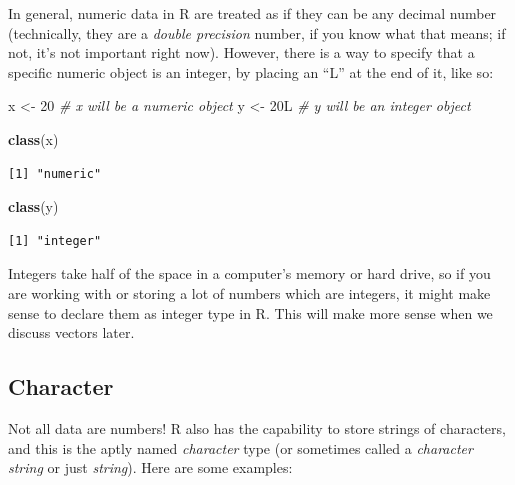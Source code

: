 \documentclass[
]{book}
\newenvironment{Shaded}{\begin{snugshade}}{\end{snugshade}}
\newcommand{\CommentTok}[1]{\textcolor[rgb]{0.56,0.35,0.01}{\textit{#1}}}
\newcommand{\DecValTok}[1]{\textcolor[rgb]{0.00,0.00,0.81}{#1}}
\newcommand{\KeywordTok}[1]{\textcolor[rgb]{0.13,0.29,0.53}{\textbf{#1}}}
\newcommand{\NormalTok}[1]{#1}
\newcommand{\StringTok}[1]{\textcolor[rgb]{0.31,0.60,0.02}{#1}}
\begin{document}
In general, numeric data in R are treated as if they can be any decimal number (technically, they are a \emph{double precision} number, if you know what that means; if not, it's not important right now).
However, there is a way to specify that a specific numeric object is an integer, by placing an ``L'' at the end of it, like so:

\begin{Shaded}
\begin{Highlighting}[]
\NormalTok{x <-}\StringTok{ }\DecValTok{20}   \CommentTok{# x will be a numeric object}
\NormalTok{y <-}\StringTok{ }\NormalTok{20L  }\CommentTok{# y will be an integer object}
\end{Highlighting}
\end{Shaded}

\begin{Shaded}
\begin{Highlighting}[]
\KeywordTok{class}\NormalTok{(x)}
\end{Highlighting}
\end{Shaded}

\begin{verbatim}
[1] "numeric"
\end{verbatim}

\begin{Shaded}
\begin{Highlighting}[]
\KeywordTok{class}\NormalTok{(y)}
\end{Highlighting}
\end{Shaded}

\begin{verbatim}
[1] "integer"
\end{verbatim}

Integers take half of the space in a computer's memory or hard drive, so if you are working with or storing a lot of numbers which are integers, it might make sense to declare them as integer type in R.
This will make more sense when we discuss vectors later.

\hypertarget{character}{%
\subsection{Character}\label{character}}

Not all data are numbers!
R also has the capability to store strings of characters, and this is the aptly named \emph{character} type (or sometimes called a \emph{character string} or just \emph{string}).
Here are some examples:
\end{document}
